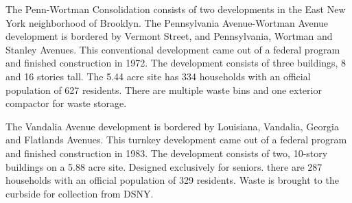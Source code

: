 The Penn-Wortman Consolidation consists of two developments in the East New York neighborhood of Brooklyn. The Pennsylvania Avenue-Wortman Avenue development is bordered by Vermont Street, and Pennsylvania, Wortman and Stanley Avenues. This conventional development came out of a federal program and finished construction in 1972. The development consists of three buildings, 8 and 16 stories tall. The 5.44 acre site has 334 households with an official population of 627 residents. There are multiple waste bins and one exterior compactor for waste storage.\par \vspace{.7\baselineskip}The Vandalia Avenue development is bordered by Louisiana, Vandalia, Georgia and Flatlands Avenues. This turnkey development came out of a federal program and finished construction in 1983. The development consists of two, 10-story buildings on a 5.88 acre site. Designed exclusively for seniors. there are 287 households with an official population of 329 residents. Waste is brought to the curbside for collection from DSNY.